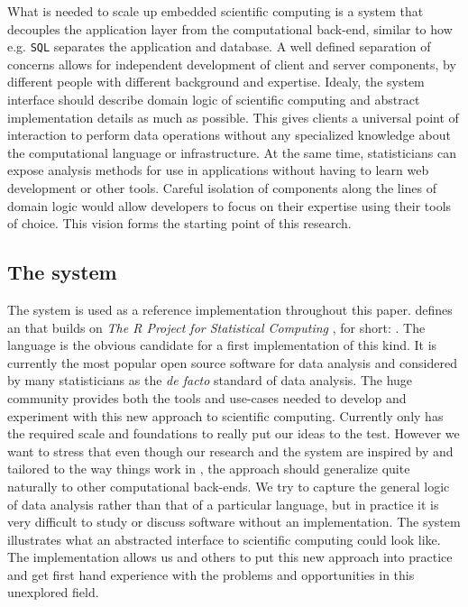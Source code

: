 What is needed to scale up embedded scientific computing is a system that decouples the application layer from the computational back-end, similar to how e.g. \texttt{SQL} separates the application and database. A well defined separation of concerns allows for independent development of client and server components, by different people with different background and expertise. Idealy, the system interface should describe domain logic of scientific computing and abstract implementation details as much as possible. This gives clients a universal point of interaction to perform data operations without any specialized knowledge about the computational language or infrastructure. At the same time, statisticians can expose analysis methods for use in applications without having to learn web development or other tools. Careful isolation of components along the lines of domain logic would allow developers to focus on their expertise using their tools of choice. This vision forms the starting point of this research. 


\subsection{The \OpenCPU system}

The \OpenCPU system is used as a reference implementation throughout this paper. \OpenCPU defines an \HTTP \API that builds on \emph{The R Project for Statistical Computing} \citep{R}, for short: \R. The \R language is the obvious candidate for a first implementation of this kind. It is currently the most popular open source software for data analysis and considered by many statisticians as the \emph{de facto} standard of data analysis. The huge \R community provides both the tools and use-cases needed to develop and experiment with this new approach to scientific computing. Currently only \R has the required scale and foundations to really put our ideas to the test. However we want to stress that even though our research and the \OpenCPU system are inspired by and tailored to the way things work in \R, the approach should generalize quite naturally to other computational back-ends. We try to capture the general logic of data analysis rather than that of a particular language, but in practice it is very difficult to study or discuss software without an implementation. The \OpenCPU system illustrates what an abstracted interface to scientific computing could look like. The implementation allows us and others to put this new approach into practice and get first hand experience with the problems and opportunities in this unexplored field. 


